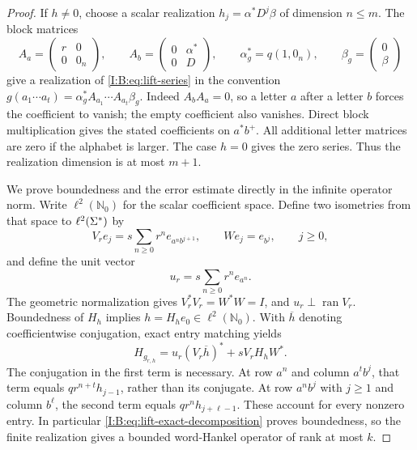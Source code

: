 \begin{proof}
If $h\ne0$, choose a scalar realization
$h_j=\alpha^*D^j\beta$ of dimension $n\le m$. The block matrices
\begin{equation}
 A_a=\begin{pmatrix}r&0\\0&0_n\end{pmatrix},\qquad
 A_b=\begin{pmatrix}0&\alpha^*\\0&D\end{pmatrix},\qquad
 \alpha_g^*=q(1,0_n),\qquad
 \beta_g=\begin{pmatrix}0\\\beta\end{pmatrix}
 \label{I:B:eq:lift-realization}
\end{equation}
give a realization of \eqref{I:B:eq:lift-series} in the convention
$g(a_1\cdots a_t)=\alpha_g^*A_{a_1}\cdots A_{a_t}\beta_g$.
Indeed $A_bA_a=0$, so a letter $a$ after a letter $b$ forces the
coefficient to vanish; the empty coefficient also vanishes. Direct block
multiplication gives the stated coefficients on $a^*b^+$. All additional
letter matrices are zero if the alphabet is larger. The case $h=0$ gives
the zero series. Thus the realization dimension is at most $m+1$.

We prove boundedness and the error estimate directly in the infinite
operator norm. Write $\ell^2(\mathbb N_0)$ for the scalar coefficient
space. Define two isometries from that space to $\ell^2(\Sigma^*)$ by
\begin{equation}
 V_r e_j=s\sum_{n\ge0}r^n e_{a^n b^{j+1}},\qquad
 W e_j=e_{b^j},\qquad j\ge0,
 \label{I:B:eq:lift-isometries}
\end{equation}
and define the unit vector
\[
 u_r=s\sum_{n\ge0}r^n e_{a^n}.
\]
The geometric normalization gives $V_r^*V_r=W^*W=I$, and
$u_r\perp\operatorname{ran}V_r$. Boundedness of $H_h$ implies
$h=H_he_0\in\ell^2(\mathbb N_0)$. With $\overline h$ denoting
coefficientwise conjugation, exact entry matching yields
\begin{equation}
 H_{g_{r,h}}
   =u_r(V_r\overline h)^*+sV_rH_hW^*.
 \label{I:B:eq:lift-exact-decomposition}
\end{equation}
The conjugation in the first term is necessary. At row $a^n$ and column
$a^t b^j$, that term equals $q r^{n+t}h_{j-1}$, rather than its
conjugate. At row $a^n b^j$ with $j\ge1$ and column $b^\ell$, the
second term equals $q r^n h_{j+\ell-1}$. These account for every
nonzero entry. In particular \eqref{I:B:eq:lift-exact-decomposition} proves
boundedness, so the finite realization gives a bounded word-Hankel
operator of rank at most $k$.


\end{proof}
